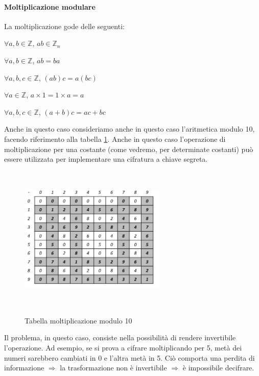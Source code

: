 \paragraph{Moltiplicazione modulare}
La moltiplicazione gode delle seguenti:
\begin{prop}
$\forall a,b \in \mathbb{Z}$, $ab \in \mathbb{Z}_n$ 
\end{prop}
\begin{prop}[(Commutativa)]
$\forall a,b \in \mathbb{Z}$, $ab = ba$ 
\end{prop}
\begin{prop}[(Associativa)]
$\forall a,b,c \in \mathbb{Z}$, $(ab)c = a(bc)$ 
\end{prop}
\begin{prop}
$\forall a \in \mathbb{Z}$, $a \times 1 = 1 \times a = a$ 
\end{prop}
\begin{prop}[(Distributiva)]
$\forall a,b,c \in \mathbb{Z}$, $(a + b)c = ac + bc$ 
\end{prop}
Anche in questo caso consideriamo anche in questo caso l'aritmetica modulo 10, facendo riferimento alla tabella \ref{fig:molt_mod}. Anche in questo caso l'operazione di moltiplicazione per una costante (come vedremo, per determinate costanti) può essere utilizzata per implementare una cifratura a chiave segreta.
\begin{figure}[htbp]
	\centering%
	\subfigure%
	{\includegraphics[height=7cm, width=7cm, keepaspectratio]{Immagini/chiave_pubblica/molt_mod.png}}
	\caption{Tabella moltiplicazione modulo 10 \label{fig:molt_mod}} 	
\end{figure}
Il problema, in questo caso, consiste nella possibilità di rendere invertibile l'operazione. Ad esempio, se si prova a cifrare moltiplicando per 5, metà dei numeri sarebbero cambiati in 0 e l'altra metà in 5. Ciò comporta una perdita di informazione $\Rightarrow$ la trasformazione non è invertibile $\Rightarrow$ è impossibile decifrare.

